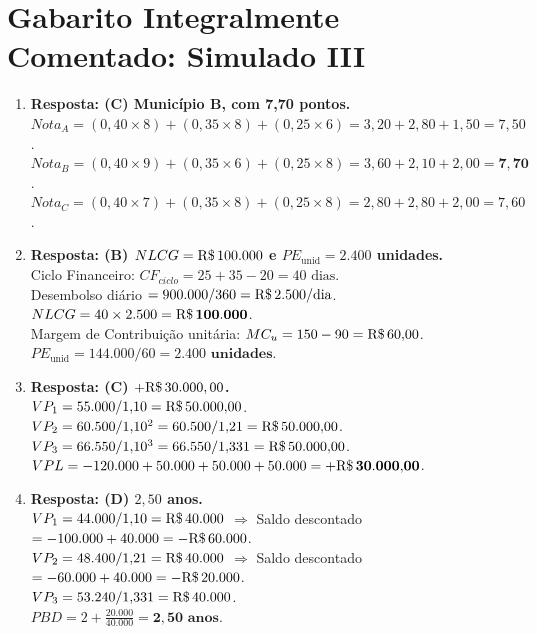 \clearpage
\section*{Gabarito Integralmente Comentado: Simulado III}

\begin{boxGabarito}
\begin{enumerate}[leftmargin=1.5em, itemsep=5pt]
  \item \textbf{Resposta: (C) Município B, com 7,70 pontos.} \\
  $Nota_A = (0{,}40 \times 8) + (0{,}35 \times 8) + (0{,}25 \times 6) = 3{,}20 + 2{,}80 + 1{,}50 = 7{,}50$. \\
  $Nota_B = (0{,}40 \times 9) + (0{,}35 \times 6) + (0{,}25 \times 8) = 3{,}60 + 2{,}10 + 2{,}00 = \mathbf{7{,}70}$. \\
  $Nota_C = (0{,}40 \times 7) + (0{,}35 \times 8) + (0{,}25 \times 8) = 2{,}80 + 2{,}80 + 2{,}00 = 7{,}60$.

  \item \textbf{Resposta: (B) $NLCG = \text{R\$\,}{100.000}$ e $PE_{\text{unid}} = 2.400$ unidades.} \\
  Ciclo Financeiro: $CF_{ciclo} = 25 + 35 - 20 = 40\text{ dias}$. \\
  Desembolso diário $= 900.000 / 360 = \text{R\$\,}{2.500/\text{dia}}$. \\
  $NLCG = 40 \times 2.500 = \mathbf{\text{R\$\,}{100.000}}$. \\
  Margem de Contribuição unitária: $MC_u = 150 - 90 = \text{R\$\,}{60{,}00}$. \\
  $PE_{\text{unid}} = 144.000 / 60 = \mathbf{2.400\text{ unidades}}$.

  \item \textbf{Resposta: (C) $+\text{R\$\,}{30.000,00}$.} \\
  $VP_1 = 55.000 / 1{,}10 = \text{R\$\,}{50.000{,}00}$. \\
  $VP_2 = 60.500 / 1{,}10^2 = 60.500 / 1{,}21 = \text{R\$\,}{50.000{,}00}$. \\
  $VP_3 = 66.550 / 1{,}10^3 = 66.550 / 1{,}331 = \text{R\$\,}{50.000{,}00}$. \\
  $VPL = -120.000 + 50.000 + 50.000 + 50.000 = \mathbf{+\text{R\$\,}{30.000{,}00}}$.

  \item \textbf{Resposta: (D) $2{,}50$ anos.} \\
  $VP_1 = 44.000 / 1{,}10 = \text{R\$\,}{40.000}$ $\Rightarrow$ Saldo descontado $= -100.000 + 40.000 = -\text{R\$\,}{60.000}$. \\
  $VP_2 = 48.400 / 1{,}21 = \text{R\$\,}{40.000}$ $\Rightarrow$ Saldo descontado $= -60.000 + 40.000 = -\text{R\$\,}{20.000}$. \\
  $VP_3 = 53.240 / 1{,}331 = \text{R\$\,}{40.000}$. \\
  $PBD = 2 + \frac{20.000}{40.000} = \mathbf{2{,}50\text{ anos}}$.


\end{enumerate}
\end{boxGabarito}
